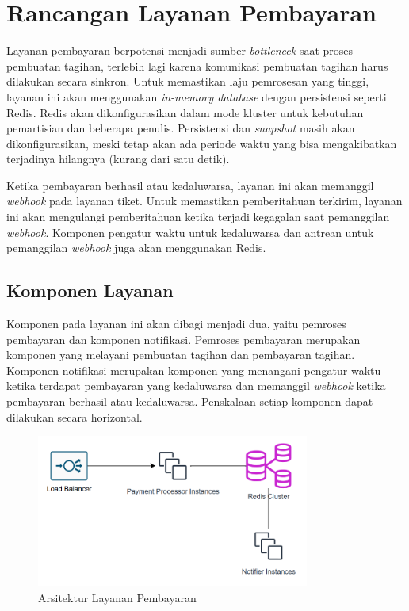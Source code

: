 \chapter{Rancangan Layanan Pembayaran}
\label{apx:payment-service}

Layanan pembayaran berpotensi menjadi sumber \textit{bottleneck} saat proses pembuatan tagihan, terlebih lagi karena komunikasi pembuatan tagihan harus dilakukan secara sinkron. Untuk memastikan laju pemrosesan yang tinggi, layanan ini akan menggunakan \textit{in-memory database} dengan persistensi seperti Redis. Redis akan dikonfigurasikan dalam mode kluster untuk kebutuhan pemartisian dan beberapa penulis. Persistensi dan \textit{snapshot} masih akan dikonfigurasikan, meski tetap akan ada periode waktu yang bisa mengakibatkan terjadinya hilangnya (kurang dari satu detik). 

Ketika pembayaran berhasil atau kedaluwarsa, layanan ini akan memanggil \textit{webhook} pada layanan tiket. Untuk memastikan pemberitahuan terkirim, layanan ini akan mengulangi pemberitahuan ketika terjadi kegagalan saat pemanggilan \textit{webhook}. Komponen pengatur waktu untuk kedaluwarsa dan antrean untuk pemanggilan \textit{webhook} juga akan menggunakan Redis.

\section{Komponen Layanan}

Komponen pada layanan ini akan dibagi menjadi dua, yaitu pemroses pembayaran dan komponen notifikasi. Pemroses pembayaran merupakan komponen yang melayani pembuatan tagihan dan pembayaran tagihan. Komponen notifikasi merupakan komponen yang menangani pengatur waktu ketika terdapat pembayaran yang kedaluwarsa dan  memanggil \textit{webhook} ketika pembayaran berhasil atau kedaluwarsa. Penskalaan setiap komponen dapat dilakukan secara horizontal.

\begin{figure}[htbp]
    \centering
    \includegraphics[width=0.8\textwidth]{resources/chapter-3/payment-service.png}
    \caption{Arsitektur Layanan Pembayaran}
    \label{fig:payment-service-deployment}
\end{figure}

